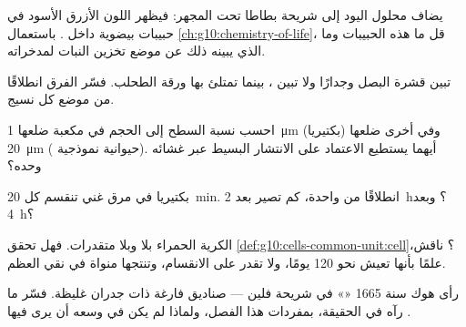 \begin{exercise}[$\star\star$]\label{exo:g10:cells-common-unit:8}
يضاف محلول اليود إلى شريحة بطاطا تحت المجهر: فيظهر اللون الأزرق
الأسود في حبيبات بيضوية داخل . باستعمال
\cref{ch:g10:chemistry-of-life}، قل ما هذه الحبيبات وما الذي يبينه
ذلك عن موضع تخزين النبات لمدخراته.
\end{exercise}

\begin{exercise}[$\star\star$]\label{exo:g10:cells-common-unit:9}
تبين  قشرة البصل  وجدارًا ولا تبين ، بينما
تمتلئ بها  ورقة الطحلب. فسّر الفرق انطلاقًا من موضع كل نسيج.
\end{exercise}

\begin{exercise}[$\star\star$]\label{exo:g10:cells-common-unit:10}
احسب نسبة السطح إلى الحجم في  مكعبة ضلعها \qty{1}{\micro m}
(بكتيريا) وفي أخرى ضلعها \qty{20}{\micro m} ( حيوانية نموذجية).
أيهما يستطيع الاعتماد على الانتشار البسيط عبر غشائه وحده؟
\end{exercise}

\begin{exercise}[$\star\star$]\label{exo:g10:cells-common-unit:11}
بكتيريا في مرق غني تنقسم كل \qty{20}{min}. انطلاقًا من  واحدة، كم
تصير بعد \qty{2}{h}؟ وبعد \qty{4}{h}؟
\end{exercise}

\begin{exercise}[$\star\star\star$]\label{exo:g10:cells-common-unit:12}
الكرية الحمراء بلا  وبلا متقدرات. فهل تحقق
\cref{def:g10:cells-common-unit:cell}؟ ناقش، علمًا بأنها تعيش نحو 120
يومًا، ولا تقدر على الانقسام، وتنتجها  منواة في نقي العظم.
\end{exercise}

\begin{exercise}[$\star\star\star$]\label{exo:g10:cells-common-unit:13}
رأى هوك سنة 1665 «» في شريحة فلين --- صناديق فارغة ذات جدران
غليظة. فسّر ما رآه في الحقيقة، بمفردات هذا الفصل، ولماذا لم يكن في
وسعه أن يرى فيها .
\end{exercise}

